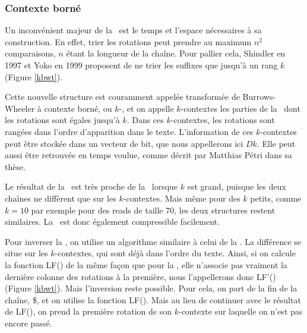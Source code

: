 \subsubsection{Contexte borné}
Un inconvénient majeur de la \bwt\ est le temps et l'espace nécessaires à sa construction. En effet, trier les rotations peut prendre au maximum $n^{2}$ comparaisons, $n$ étant la longueur de la chaîne.
Pour pallier cela, Shindler en 1997 et Yoko en 1999 proposent de ne trier les suffixes que jusqu'à un rang $k$ (Figure \ref{kbwt}).

Cette nouvelle structure est couramment appelée transformée de Burrows-Wheeler à contexte borné, ou $k$-\bwt, et on appelle $k$-contextes les parties de la \kbwt\ dont les rotations sont égales jusqu'à $k$. Dans ces $k$-contextes, les rotations sont rangées dans l'ordre d'apparition dans le texte. L'information de ces $k$-contextes peut être stockée dans un vecteur de bit, que nous appellerons ici $Dk$. Elle peut aussi être retrouvée en temps voulue, comme décrit par Matthias Pétri dans sa thèse.

Le résultat de la \kbwt\ est très proche de la \bwt\ lorsque $k$ est grand, puisque les deux chaînes ne diffèrent que sur les $k$-contextes. Mais même pour des $k$ petits, comme $k = 10$ par exemple pour des reads de taille 70, les deux structures restent similaires. La \kbwt\ est donc également compressible facilement.

Pour inverser la \kbwt, on utilise un algorithme similaire à celui de la \bwt. La différence se situe sur les $k$-contextes, qui sont déjà dans l'ordre du texte. Ainsi, si on calcule la fonction LF() de la même façon que pour la \bwt, elle n'associe pas vraiment la dernière colonne des rotations à la première, nous l'appellerons donc LF'() (Figure \ref{kbwt}). Mais l'inversion reste possible. Pour cela, on part de la fin de la chaîne, \$, et on utilise la fonction LF(). Mais au lieu de continuer avec le résultat de LF(), on prend la première rotation de son $k$-contexte sur laquelle on n'est pas encore passé.


